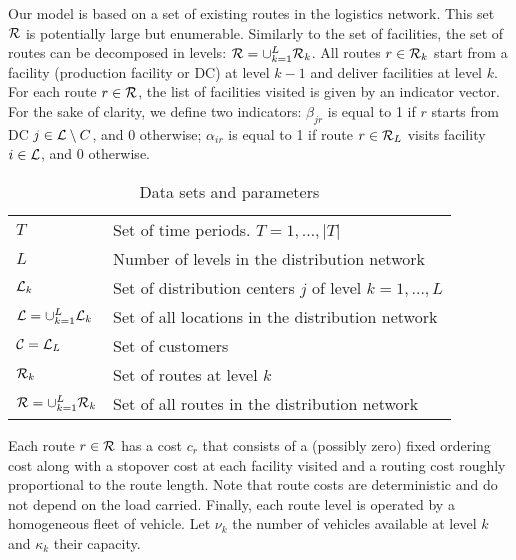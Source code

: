 \documentclass[a4paper,10pt]{article}
\begin{document}
\begin{linenumbers}
Our model is based on a set of existing routes in the logistics network. 
This set $\mathcal{R}$ is potentially large but enumerable. 
Similarly to the set of facilities, the set of routes can be decomposed in levels: $\mathcal{R} = \cup_{k=1}^{L} \mathcal{R}_k$. 
All routes $r \in \mathcal{R}_k$ start from a facility (production facility or DC) at level $k-1$ and deliver facilities at level $k$. 
For each route $r \in \mathcal{R}$, the list of facilities visited is given by an indicator vector. 
For the sake of clarity, we define two indicators: 
$\beta_{jr}$ is equal to 1 if $r$ starts from DC $j \in \mathcal{L} \setminus C$, and 0 otherwise;
$\alpha_{ir}$ is equal to 1 if route $r \in \mathcal{R}_{L}$ visits facility $i \in \mathcal{L}$, and 0 otherwise.
%

\begin{table}[htbp]
	\centering
	\begin{tabular}{ll}
		\toprule
		$T$ & Set of time periods. $T = 1,\dots,|T|$\\
		$L$ & Number of levels in the distribution network\\
		$\mathcal{L}_k$ & Set of distribution centers $j$ of level $k=1, \ldots,L$ \\
		$\mathcal{L}=\cup_{k=1}^L \mathcal{L}_k$ & Set of all locations in the distribution network\\
		$\mathcal{C}=\mathcal{L}_L$ & Set of customers \\ 
		$\mathcal{R}_k$ & Set of routes at level $k$\\
		$\mathcal{R} = \cup_{k=1}^{L} \mathcal{R}_k$ & Set of all routes in the distribution network\\
		\bottomrule
	\end{tabular}
	\caption{Data sets and parameters}
	\label{tab:set}
\end{table}       

Each route 	$r\in \mathcal{R}$ has a cost $c_r$ that consists of a (possibly zero) fixed ordering cost along with a stopover cost at each facility visited and a routing cost roughly proportional to the route length. Note that route costs are deterministic and do not depend on the load carried. 
Finally, each route level is operated by a homogeneous fleet of vehicle. 
Let $\nu_k$ the number of vehicles available at level $k$ and $\kappa_k$ their capacity. 


\end{linenumbers}
\end{document}
